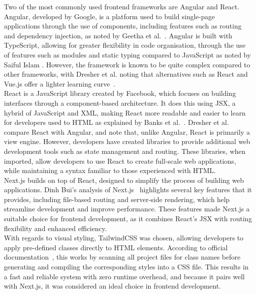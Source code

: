 \documentclass[]{final_report}
\begin{document}
Two of the most commonly used frontend frameworks are Angular and React. Angular, developed by Google, is a platform used to build single-page applications through the use of components, including features such as routing and dependency injection, as noted by Geetha et al.~\cite{ANGULAR_ANALYSIS}. Angular is built with TypeScript, allowing for greater flexibility in code organisation, through the use of features such as modules and static typing compared to JavaScript as noted by Saiful Islam \cite{TSvJS}. However, the framework is known to be quite complex compared to other frameworks, with Dresher et al. noting that alternatives such as React and Vue.js offer a lighter learning curve~\cite{FRAMEWORKS}.\\

React is a JavaScript library created by Facebook, which focuses on building interfaces through a component-based architecture. It does this using JSX, a hybrid of JavaScript and XML, making React more readable and easier to learn for developers used to HTML as explained by Banks et al.~\cite{BANKS_REACT}. Dresher et al.~\cite{FRAMEWORKS} compare React with Angular, and note that, unlike Angular, React is primarily a view engine. However, developers have created libraries to provide additional web development tools such as state management and routing. These libraries, when imported, allow developers to use React to create full-scale web applications, while maintaining a syntax familiar to those experienced with HTML.\\

Next.js builds on top of React, designed to simplify the process of building web applications. Dinh Bui's analysis of Next.js~\cite{DB_NEXTJS} highlights several key features that it provides, including file-based routing and server-side rendering, which help streamline development and improve performance. These features made Next.js a suitable choice for frontend development, as it combines React's JSX with routing flexibility and enhanced efficiency.\\

With regards to visual styling, TailwindCSS was chosen, allowing developers to apply pre-defined classes directly to HTML elements. According to official documentation~\cite{TAILWIND}, this works by scanning all project files for class names before generating and compiling the corresponding styles into a CSS file. This results in a fast and reliable system with zero runtime overhead, and because it pairs well with Next.js, it was considered an ideal choice in frontend development.
\end{document}
